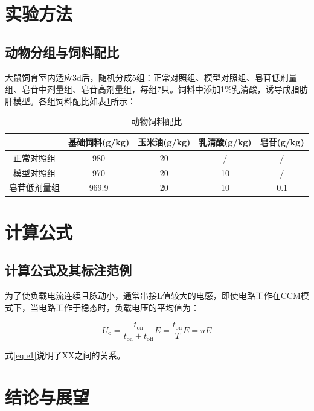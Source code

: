 \documentclass{QITthesis}
\begin{document}
\section{实验方法}
\subsection{动物分组与饲料配比}

大鼠饲育室内适应3d后，随机分成5组：正常对照组、模型对照组、皂苷低剂量组、皂苷中剂量组、皂苷高剂量组，每组7只。饲料中添加1\%乳清酸，诱导成脂肪肝模型。各组饲料配比如表\ref{tab:t1}所示：

\begin{table}[H]
    \centering
    \caption{动物饲料配比}
    \label{tab:t1}
    \begin{tabular}{ccccc}
        \toprule
                     & 基础饲料(g/kg) & 玉米油(g/kg) & 乳清酸(g/kg) & 皂苷(g/kg) \\
        \midrule
        正常对照组   & 980            & 20           & /            & /          \\
        模型对照组   & 970            & 20           & 10           & /          \\
        皂苷低剂量组 & 969.9          & 20           & 10           & 0.1        \\
        \bottomrule
    \end{tabular}
\end{table}

\section{计算公式}
\subsection{计算公式及其标注范例}

为了使负载电流连续且脉动小，通常串接L值较大的电感，即使电路工作在CCM模式下，当电路工作于稳态时，负载电压的平均值为：

\begin{equation}
    U_{\mathrm{o}}=\frac{t_{\mathrm{on}}}{t_{\mathrm{on}}+t_{\mathrm{off}}} E=\frac{t_{\mathrm{on}}}{T} E=u E
    \label{eq:e1}
\end{equation}

式\eqref{eq:e1}说明了XX之间的关系。

\section{结论与展望}
\end{document}
